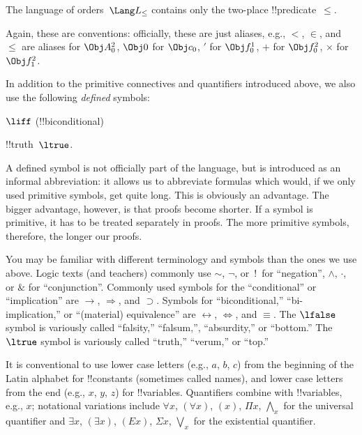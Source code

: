 \begin{ex}
The language of orders~$\Lang L_\le$ contains only the two-place
!!{predicate}~$\le$.
\end{ex}

Again, these are conventions: officially, these are just aliases,
e.g., $<$, $\in$, and $\le$ are aliases for $\Obj A^2_0$, $\Obj 0$ for
$\Obj c_0$, $\prime$ for $\Obj f^1_0$, $+$ for $\Obj f^2_0$, $\times$ for
$\Obj f^2_1$.


In addition to the primitive connectives and
quantifiers introduced
above, we also use the following \emph{defined} symbols:
\startycommalist
  
  
  
  
  \ycomma $\liff$ (!!{biconditional})
  
  
  
  \ycomma !!{truth}~$\ltrue$.


\begin{explain}
A defined symbol is not officially part of the language, but is
introduced as an informal abbreviation: it allows us to abbreviate
formulas which would, if we only used primitive symbols, get quite
long.  This is obviously an advantage.  The bigger advantage, however,
is that proofs become shorter.  If a symbol is primitive, it has to be
treated separately in proofs. The more primitive symbols, therefore,
the longer our proofs.
\end{explain}




\begin{intro}
You may be familiar with different terminology and symbols than the
ones we use above. Logic texts (and teachers) commonly use 
$\sim$, $\neg$, or~!\ for ``negation'', $\wedge$, $\cdot$, or $\&$
for ``conjunction''.  Commonly used symbols for the ``conditional'' or
``implication'' are $\rightarrow$, $\Rightarrow$, and $\supset$.
Symbols for ``biconditional,'' ``bi-implication,''
  or ``(material) equivalence'' are $\leftrightarrow$,
  $\Leftrightarrow$, and $\equiv$.
The $\lfalse$ symbol is variously called
  ``falsity,'' ``falsum,'', ``absurdity,'' or ``bottom.''
The $\ltrue$ symbol is variously called
  ``truth,'' ``verum,'' or ``top.''

It is conventional to use lower case letters (e.g., $a$, $b$, $c$) from
the beginning of the Latin alphabet for !!{constant}s (sometimes called
names), and lower case letters from the end (e.g., $x$, $y$, $z$) for
!!{variable}s. Quantifiers combine with !!{variable}s, e.g., $x$;
notational variations include $\forall x$, $(\forall x)$, $(x)$, $\Pi x$,
$\bigwedge_x$ for the universal quantifier and $\exists x$, $(\exists
x)$, $(Ex)$, $\Sigma x$, $\bigvee_x$ for the existential quantifier.
\end{intro}

